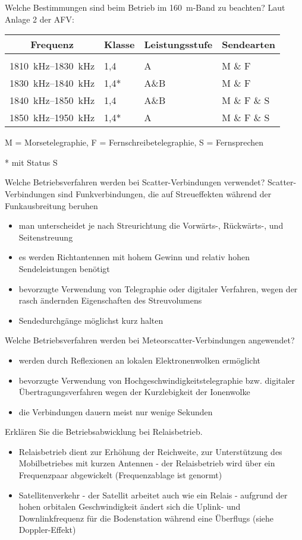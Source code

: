 \documentclass[avery5371,grid,frame,a4paper]{flashcards}
\newcommand{\card}[3]{
  \begin{flashcard}[{\chap} -- #1]{#2}#3\end{flashcard}
}
\begin{document}
\card{56}{Welche Bestimmungen sind beim Betrieb im \SI{160}{\metre}-Band zu beachten?}{
  Laut Anlage 2 der AFV:

  \footnotesize
  \vspace{10pt}
  \begin{tabular}{clll}
    Frequenz & Klasse & Leistungsstufe & Sendearten \\
  \hline \\
    \SIrange{1810}{1830}{\kilo\Hz} & 1,4  & A    & M \& F \\
    \SIrange{1830}{1840}{\kilo\Hz} & 1,4* & A\&B & M \& F \\
    \SIrange{1840}{1850}{\kilo\Hz} & 1,4  & A\&B & M \& F \& S \\
    \SIrange{1850}{1950}{\kilo\Hz} & 1,4* & A    & M \& F \& S \\
  \end{tabular}
  \vspace{10pt}

  M = Morsetelegraphie, F = Fernschreibetelegraphie, S = Fernsprechen

  * \quad mit Status S
}
\card{57}{Welche Betriebsverfahren werden bei Scatter-Verbindungen verwendet?}{
  \small
  Scatter-Verbindungen sind Funkverbindungen, die auf Streueffekten während der Funkausbreitung beruhen
  \begin{itemize}
    \item man unterscheidet je nach Streurichtung die Vorwärts-, Rückwärts-, und Seitenstreuung
    \item es werden Richtantennen mit hohem Gewinn und relativ hohen Sendeleistungen benötigt
    \item bevorzugte Verwendung von Telegraphie oder digitaler Verfahren, wegen der rasch ändernden Eigenschaften des Streuvolumens
    \item Sendedurchgänge möglichst kurz halten
  \end{itemize}
}
\card{58}{Welche Betriebsverfahren werden bei Meteorscatter-Verbindungen angewendet?}{
  \begin{itemize}
    \item werden durch Reflexionen an lokalen Elektronenwolken ermöglicht
    \item bevorzugte Verwendung von Hochgeschwindigkeitstelegraphie bzw. digitaler Übertragungsverfahren wegen der Kurzlebigkeit der Ionenwolke
    \item die Verbindungen dauern meist nur wenige Sekunden
  \end{itemize}
}
\card{59}{Erklären Sie die Betriebsabwicklung bei Relaisbetrieb.}{
  \begin{itemize}
    \item Relaisbetrieb dient zur Erhöhung der Reichweite, zur Unterstützung des Mobilbetriebes mit kurzen Antennen - der Relaisbetrieb wird über ein Frequenzpaar abgewickelt (Frequenzablage ist genormt)

    \item Satellitenverkehr - der Satellit arbeitet auch wie ein Relais - aufgrund der hohen orbitalen Geschwindigkeit ändert sich die Uplink- und Downlinkfrequenz für die Bodenstation während eine Überflugs (siehe Doppler-Effekt)
  \end{itemize}
}
\end{document}

